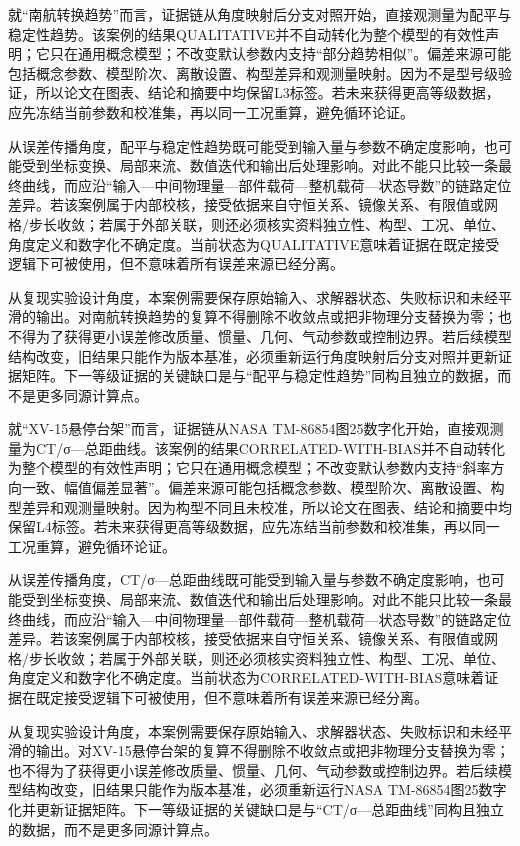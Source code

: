 \documentclass[UTF8,12pt,openany]{ctexbook}
\begin{document}
就“南航转换趋势”而言，证据链从角度映射后分支对照开始，直接观测量为配平与稳定性趋势。该案例的结果QUALITATIVE并不自动转化为整个模型的有效性声明；它只在通用概念模型；不改变默认参数内支持“部分趋势相似”。偏差来源可能包括概念参数、模型阶次、离散设置、构型差异和观测量映射。因为不是型号级验证，所以论文在图表、结论和摘要中均保留L3标签。若未来获得更高等级数据，应先冻结当前参数和校准集，再以同一工况重算，避免循环论证。

从误差传播角度，配平与稳定性趋势既可能受到输入量与参数不确定度影响，也可能受到坐标变换、局部来流、数值迭代和输出后处理影响。对此不能只比较一条最终曲线，而应沿“输入—中间物理量—部件载荷—整机载荷—状态导数”的链路定位差异。若该案例属于内部校核，接受依据来自守恒关系、镜像关系、有限值或网格/步长收敛；若属于外部关联，则还必须核实资料独立性、构型、工况、单位、角度定义和数字化不确定度。当前状态为QUALITATIVE意味着证据在既定接受逻辑下可被使用，但不意味着所有误差来源已经分离。

从复现实验设计角度，本案例需要保存原始输入、求解器状态、失败标识和未经平滑的输出。对南航转换趋势的复算不得删除不收敛点或把非物理分支替换为零；也不得为了获得更小误差修改质量、惯量、几何、气动参数或控制边界。若后续模型结构改变，旧结果只能作为版本基准，必须重新运行角度映射后分支对照并更新证据矩阵。下一等级证据的关键缺口是与“配平与稳定性趋势”同构且独立的数据，而不是更多同源计算点。

就“XV-15悬停台架”而言，证据链从NASA TM-86854图25数字化开始，直接观测量为CT/σ—总距曲线。该案例的结果CORRELATED-WITH-BIAS并不自动转化为整个模型的有效性声明；它只在通用概念模型；不改变默认参数内支持“斜率方向一致、幅值偏差显著”。偏差来源可能包括概念参数、模型阶次、离散设置、构型差异和观测量映射。因为构型不同且未校准，所以论文在图表、结论和摘要中均保留L4标签。若未来获得更高等级数据，应先冻结当前参数和校准集，再以同一工况重算，避免循环论证。

从误差传播角度，CT/σ—总距曲线既可能受到输入量与参数不确定度影响，也可能受到坐标变换、局部来流、数值迭代和输出后处理影响。对此不能只比较一条最终曲线，而应沿“输入—中间物理量—部件载荷—整机载荷—状态导数”的链路定位差异。若该案例属于内部校核，接受依据来自守恒关系、镜像关系、有限值或网格/步长收敛；若属于外部关联，则还必须核实资料独立性、构型、工况、单位、角度定义和数字化不确定度。当前状态为CORRELATED-WITH-BIAS意味着证据在既定接受逻辑下可被使用，但不意味着所有误差来源已经分离。

从复现实验设计角度，本案例需要保存原始输入、求解器状态、失败标识和未经平滑的输出。对XV-15悬停台架的复算不得删除不收敛点或把非物理分支替换为零；也不得为了获得更小误差修改质量、惯量、几何、气动参数或控制边界。若后续模型结构改变，旧结果只能作为版本基准，必须重新运行NASA TM-86854图25数字化并更新证据矩阵。下一等级证据的关键缺口是与“CT/σ—总距曲线”同构且独立的数据，而不是更多同源计算点。
\end{document}
